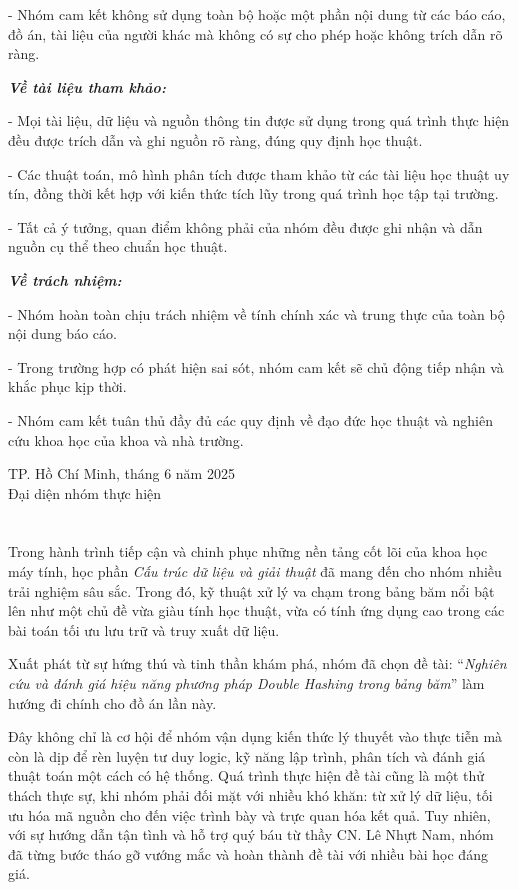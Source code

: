 \documentclass[12pt,a4paper]{report}
\begin{document}
- Nhóm cam kết không sử dụng toàn bộ hoặc một phần nội dung từ các báo cáo, đồ án, tài liệu của người khác mà không có sự cho phép hoặc không trích dẫn rõ ràng.

\textbf{\textit{Về tài liệu tham khảo:}}

- Mọi tài liệu, dữ liệu và nguồn thông tin được sử dụng trong quá trình thực hiện đều được trích dẫn và ghi nguồn rõ ràng, đúng quy định học thuật.

- Các thuật toán, mô hình phân tích được tham khảo từ các tài liệu học thuật uy tín, đồng thời kết hợp với kiến thức tích lũy trong quá trình học tập tại trường.

- Tất cả ý tưởng, quan điểm không phải của nhóm đều được ghi nhận và dẫn nguồn cụ thể theo chuẩn học thuật.

\textbf{\textit{Về trách nhiệm:}}

- Nhóm hoàn toàn chịu trách nhiệm về tính chính xác và trung thực của toàn bộ nội dung báo cáo.

- Trong trường hợp có phát hiện sai sót, nhóm cam kết sẽ chủ động tiếp nhận và khắc phục kịp thời.

- Nhóm cam kết tuân thủ đầy đủ các quy định về đạo đức học thuật và nghiên cứu khoa học của khoa và nhà trường.

\begin{flushright}
TP. Hồ Chí Minh, tháng 6 năm 2025\\
Đại diện nhóm thực hiện \\
\end{flushright}

\chapter*{}
\noindent \indent Trong hành trình tiếp cận và chinh phục những nền tảng cốt lõi của khoa học máy tính, học phần \textit{Cấu trúc dữ liệu và giải thuật} đã mang đến cho nhóm nhiều trải nghiệm sâu sắc. Trong đó, kỹ thuật xử lý va chạm trong bảng băm nổi bật lên như một chủ đề vừa giàu tính học thuật, vừa có tính ứng dụng cao trong các bài toán tối ưu lưu trữ và truy xuất dữ liệu.

Xuất phát từ sự hứng thú và tinh thần khám phá, nhóm đã chọn đề tài:
“\textit{Nghiên cứu và đánh giá hiệu năng phương pháp Double Hashing trong bảng băm}” làm hướng đi chính cho đồ án lần này.

Đây không chỉ là cơ hội để nhóm vận dụng kiến thức lý thuyết vào thực tiễn mà còn là dịp để rèn luyện tư duy logic, kỹ năng lập trình, phân tích và đánh giá thuật toán một cách có hệ thống. Quá trình thực hiện đề tài cũng là một thử thách thực sự, khi nhóm phải đối mặt với nhiều khó khăn: từ xử lý dữ liệu, tối ưu hóa mã nguồn cho đến việc trình bày và trực quan hóa kết quả. Tuy nhiên, với sự hướng dẫn tận tình và hỗ trợ quý báu từ thầy CN. Lê Nhựt Nam, nhóm đã từng bước tháo gỡ vướng mắc và hoàn thành đề tài với nhiều bài học đáng giá.
\end{document}

